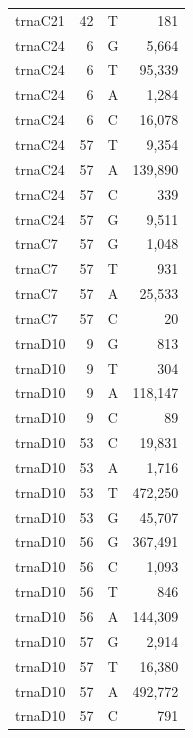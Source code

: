 \documentclass[12pt]{rockefeller}
\begin{document}
\begin{tiny}
\begin{longtable}{|l|r|c|r|}
 trnaC21 &        42 &          T &        181 \\
 trnaC24 &         6 &          G &      5,664 \\
 trnaC24 &         6 &          T &     95,339 \\
 trnaC24 &         6 &          A &      1,284 \\
 trnaC24 &         6 &          C &     16,078 \\
 trnaC24 &        57 &          T &      9,354 \\
 trnaC24 &        57 &          A &    139,890 \\
 trnaC24 &        57 &          C &        339 \\
 trnaC24 &        57 &          G &      9,511 \\
  trnaC7 &        57 &          G &      1,048 \\
  trnaC7 &        57 &          T &        931 \\
  trnaC7 &        57 &          A &     25,533 \\
  trnaC7 &        57 &          C &         20 \\
 trnaD10 &         9 &          G &        813 \\
 trnaD10 &         9 &          T &        304 \\
 trnaD10 &         9 &          A &    118,147 \\
 trnaD10 &         9 &          C &         89 \\
 trnaD10 &        53 &          C &     19,831 \\
 trnaD10 &        53 &          A &      1,716 \\
 trnaD10 &        53 &          T &    472,250 \\
 trnaD10 &        53 &          G &     45,707 \\
 trnaD10 &        56 &          G &    367,491 \\
 trnaD10 &        56 &          C &      1,093 \\
 trnaD10 &        56 &          T &        846 \\
 trnaD10 &        56 &          A &    144,309 \\
 trnaD10 &        57 &          G &      2,914 \\
 trnaD10 &        57 &          T &     16,380 \\
 trnaD10 &        57 &          A &    492,772 \\
 trnaD10 &        57 &          C &        791 \\

\end{longtable}
\end{tiny}
\end{document}
